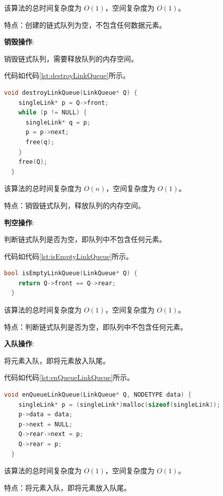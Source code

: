 \documentclass[lang=cn,newtx,10pt,scheme=chinese]{../elegantbook}
\begin{document}
该算法的总时间复杂度为 $O(1)$，空间复杂度为 $O(1)$。

特点：创建的链式队列为空，不包含任何数据元素。

\textbf{销毁操作}:

销毁链式队列，需要释放队列的内存空间。

代码如代码\ref{lst:destroyLinkQueue}所示。

\begin{lstlisting}[language=C++, caption={销毁链式队列示例代码}, label={lst:destroyLinkQueue}]
  void destroyLinkQueue(LinkQueue* Q) {
    singleLink* p = Q->front;
    while (p != NULL) {
      singleLink* q = p;
      p = p->next;
      free(q);
    }
    free(Q);
  }

\end{lstlisting}

该算法的总时间复杂度为 $O(n)$，空间复杂度为 $O(1)$。

特点：销毁链式队列，释放队列的内存空间。

\textbf{判空操作}:

判断链式队列是否为空，即队列中不包含任何元素。

代码如代码\ref{lst:isEmptyLinkQueue}所示。

\begin{lstlisting}[language=C++, caption={判断链式队列是否为空示例代码}, label={lst:isEmptyLinkQueue}]
  bool isEmptyLinkQueue(LinkQueue* Q) {
    return Q->front == Q->rear;
  }

\end{lstlisting}

该算法的总时间复杂度为 $O(1)$，空间复杂度为 $O(1)$。

特点：判断链式队列是否为空，即队列中不包含任何元素。

\textbf{入队操作}:

将元素入队，即将元素放入队尾。

代码如代码\ref{lst:enQueueLinkQueue}所示。

\begin{lstlisting}[language=C++, caption={入队示例代码}, label={lst:enQueueLinkQueue}]
  void enQueueLinkQueue(LinkQueue* Q, NODETYPE data) {
    singleLink* p = (singleLink*)malloc(sizeof(singleLink));
    p->data = data;
    p->next = NULL;
    Q->rear->next = p;
    Q->rear = p;
  }

\end{lstlisting}

该算法的总时间复杂度为 $O(1)$，空间复杂度为 $O(1)$。

特点：将元素入队，即将元素放入队尾。
\end{document}
